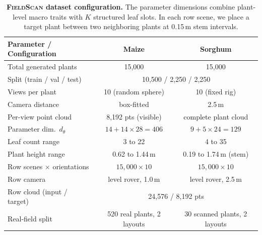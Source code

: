 \documentclass[10pt,twocolumn,letterpaper]{article}
\newcommand{\dataset}{\textup{\textsc{FieldScan}}}
\begin{document}
\begin{table}[t]
  \caption{\textbf{\dataset{} dataset configuration.} The parameter dimensions combine plant-level macro traits with $K$ structured leaf slots. In each row scene, we place a target plant between two neighboring plants at 0.15\,m stem intervals.}
  \label{tab:fieldproc}
  \centering\scriptsize
  \setlength{\tabcolsep}{2pt}
  \begin{tabular}{lcc}
    \toprule
    Parameter / Configuration & Maize & Sorghum \\
    \midrule
    Total generated plants & 15{,}000 & 15{,}000 \\
    Split (train / val / test) & \multicolumn{2}{c}{10{,}500 / 2{,}250 / 2{,}250} \\
    Views per plant & 10 (random sphere) & 10 (fixed rig) \\
    Camera distance & box-fitted & 2.5\,m \\
    Per-view point cloud & 8{,}192 pts (visible) & complete plant cloud \\
    Parameter dim.\ $d_\theta$ & $14{+}14{\times}28{=}406$ & $9{+}5{\times}24{=}129$ \\
    Leaf count range & 3 to 22 & 4 to 35 \\
    Plant height range & 0.62 to 1.44\,m & 0.19 to 1.74\,m (stem) \\
    Row scenes $\times$ orientations & $15{,}000 \times 10$ & $15{,}000 \times 10$ \\
    Row camera & level rover, 1.0\,m & level rover, 2.5\,m \\
    Row cloud (input / target) & \multicolumn{2}{c}{24{,}576 / 8{,}192 pts} \\
    Real-field split & 520 real plants, 2 layouts & 30 scanned plants, 2 layouts \\
    \bottomrule
  \end{tabular}
\end{table}
\end{document}
